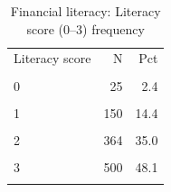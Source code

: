 \begin{table}[htbp]\centering\small
\caption{Financial literacy: Literacy score (0--3) frequency}
\label{tab:finlit_freq}
\begin{tabular}{lrr}\toprule
Literacy score & N & Pct \\\\ \midrule
0 & 25 & 2.4 \\\\
1 & 150 & 14.4 \\\\
2 & 364 & 35.0 \\\\
3 & 500 & 48.1 \\\\
\bottomrule
\end{tabular}\end{table}
